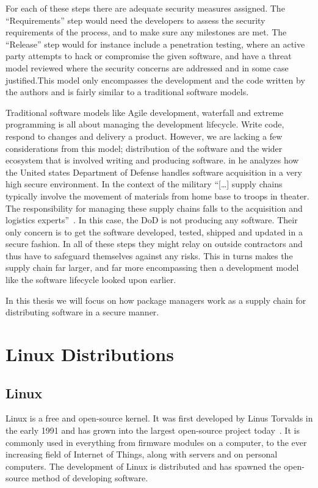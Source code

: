 \documentclass[../Main/thesis.tex]{subfiles}
\begin{document}
For each of these steps there are adequate security measures assigned. The
``Requirements'' step would need the developers to assess the security
requirements of the process, and to make sure any milestones are met. The
``Release'' step would for instance include a penetration testing, where an
active party attempts to hack or compromise the given software, and have a
threat model reviewed where the security concerns are addressed and in some case
justified.This model only encompasses the development and the code written by
the authors and is fairly similar to a traditional software models. 

Traditional software models like Agile development, waterfall and extreme
programming is all about managing the development lifecycle. Write code, respond
to changes and delivery a product. However, we are lacking a few considerations
from this model; distribution of the software and the wider ecosystem that is
involved writing and producing software. \citeauthor{rj-ellison-2010} in
 he analyzes how the United states Department of
Defense handles software acquisition in a very high secure environment. In the
context of the military ``[\dots] supply chains typically involve the movement
of materials from home base to troops in theater. The responsibility for
managing these supply chains falls to the acquisition and logistics
experts''~\cite{rj-ellison-2010}. In this case, the DoD is not producing any
software. Their only concern is to get the software developed, tested, shipped
and updated in a secure fashion. In all of these steps they might relay on
outside contractors and thus have to safeguard themselves against any risks.
This in turns makes the supply chain far larger, and far more encompassing then
a development model like the software lifecycle looked upon earlier.

In this thesis we will focus on how package managers work as a supply chain for
distributing software in a secure manner.

\section{Linux Distributions}\label{sec:linux_distributions}
\subsection*{Linux}
Linux is a free and open-source kernel. It was first developed by Linus Torvalds
in the early 1991 and has grown into the largest open-source project
today~\cite{linuxfoundation-linux}. It is commonly used in everything from
firmware modules on a computer, to the ever increasing field of Internet of
Things, along with servers and on personal computers. The development of Linux is
distributed and has spawned the open-source method of developing software.
\end{document}
